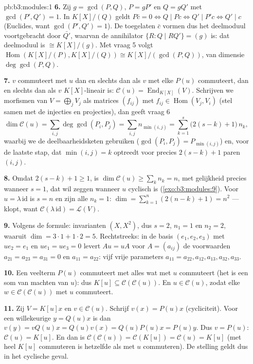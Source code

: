 \begin{solution}{pb:b3:modules:1}
\textbf{6.} Zij $g = \gcd(P, Q)$, $P = gP'$ en $Q = gQ'$ met
$\gcd(P', Q') = 1$. In $K[X]/(Q)$ geldt $P\bar c = 0 \iff Q \mid
Pc \iff Q' \mid P'c \iff Q' \mid c$ (Euclides, want $\gcd(P', Q')
= 1$). De toegelaten $\bar c$ vormen dus het deelmoduul
voortgebracht door $\bar{Q'}$, waarvan de annihilator $\{R : Q
\mid RQ'\} = (g)$ is: dat deelmoduul is $\cong K[X]/(g)$. Met
vraag 5 volgt $\operatorname{Hom}(K[X]/(P), K[X]/(Q)) \cong
K[X]/(\gcd(P,Q))$, van dimensie $\deg\gcd(P,Q)$.

\textbf{7.} $v$ commuteert met $u$ dan en slechts dan als $v$ met
elke $P(u)$ commuteert, dan en slechts dan als $v$
$K[X]$-lineair is: $\mathcal C(u) = \operatorname{End}_{K[X]}(V)$.
Schrijven we morfismen van $V = \bigoplus_j V_j$ als matrices
$(f_{ij})$ met $f_{ij} \in \operatorname{Hom}(V_j, V_i)$ (stel
samen met de injecties en projecties), dan geeft vraag 6
\[
\dim \mathcal C(u) = \sum_{i,j} \deg\gcd(P_i, P_j)
= \sum_{i,j} n_{\min(i,j)}
= \sum_{k=1}^{s} \bigl(2(s - k) + 1\bigr)\,n_k ,
\]
waarbij we de deelbaarheidsketen gebruiken ($\gcd(P_i, P_j) =
P_{\min(i,j)}$) en, voor de laatste stap, dat $\min(i,j) = k$
optreedt voor precies $2(s - k) + 1$ paren $(i, j)$.

\textbf{8.} Omdat $2(s-k)+1 \geq 1$, is $\dim\mathcal C(u) \geq
\sum_k n_k = n$, met gelijkheid precies wanneer $s = 1$, dat wil
zeggen wanneer $u$ cyclisch is (\cref{exo:b3:modules:9}). Voor $u
= \lambda\,\mathrm{id}$ is $s = n$ en zijn alle $n_k = 1$: $\dim =
\sum_{k=1}^n (2(n-k)+1) = n^2$ --- klopt, want $\mathcal
C(\lambda\,\mathrm{id}) = \mathcal L(V)$.

\textbf{9.} Volgens de formule: invarianten $(X, X^2)$, dus $s =
2$, $n_1 = 1$ en $n_2 = 2$, waaruit $\dim = 3\cdot1 + 1\cdot2 =
5$. Rechtstreeks: in de basis $(e_1, e_2, e_3)$ met $u e_2 = e_1$
en $ue_1 = ue_3 = 0$ levert $Au = uA$ voor $A = (a_{ij})$ de
voorwaarden $a_{21} = a_{23} = a_{31} = 0$ en $a_{11} = a_{22}$:
vijf vrije parameters $a_{11}{=}a_{22}, a_{12}, a_{13}, a_{32},
a_{33}$.

\textbf{10.} Een veelterm $P(u)$ commuteert met alles wat met $u$
commuteert (het is een som van machten van $u$): dus $K[u]
\subseteq \mathcal C(\mathcal C(u))$. En $u \in \mathcal C(u)$,
zodat elke $w \in \mathcal C(\mathcal C(u))$ met $u$ commuteert.

\textbf{11.} Zij $V = K[u]x$ en $v \in \mathcal C(u)$. Schrijf
$v(x) = P(u)x$ (cycliciteit). Voor een willekeurige $y = Q(u)x$ is
dan $v(y) = vQ(u)x = Q(u)v(x) = Q(u)P(u)x = P(u)y$. Dus $v =
P(u)$: $\mathcal C(u) = K[u]$. En dan is $\mathcal C(\mathcal
C(u)) = \mathcal C(K[u]) = \mathcal C(u) = K[u]$ (met heel $K[u]$
commuteren is hetzelfde als met $u$ commuteren). De stelling geldt
dus in het cyclische geval.


\end{solution}
